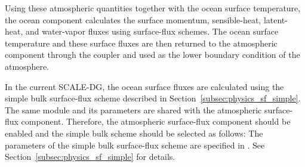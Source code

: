 Using these atmospheric quantities together with the ocean surface temperature, 
the ocean component calculates the surface momentum, sensible-heat, latent-heat, and water-vapor fluxes using surface-flux schemes.
The ocean surface temperature and these surface fluxes are then returned
to the atmospheric component through the coupler and used as the lower boundary condition of the atmosphere.


In the current SCALE-DG, the ocean surface fluxes are calculated using the simple bulk surface-flux scheme described in Section~\ref{subsec:physics_sf_simple}.
The same module and its parameters are shared with the atmospheric surface-flux component.
Therefore, the atmospheric surface-flux component should be enabled
and the simple bulk scheme should be selected as follows:
The parameters of the simple bulk surface-flux scheme are specified in . 
See Section~\ref{subsec:physics_sf_simple} for details.
